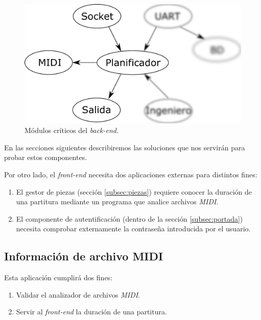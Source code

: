\begin{figure}[H]
	\noindent \begin{centering}
		\includegraphics[width=\linewidth/2]{capitulo4/daemon_critical}
		\par\end{centering}
	\smallskip
	\caption{\label{fig:daemon_critical} Módulos críticos del \textit{back-end}.}
\end{figure} 

\smallskip

En las secciones siguientes describiremos las soluciones que nos servirán para probar estos componentes.

Por otro lado, el \textit{front-end} necesita dos aplicaciones externas para distintos fines:

\begin{enumerate}
	\item El gestor de piezas (sección \ref{subsec:piezas}) requiere conocer la duración de una partitura mediante un programa que analice archivos \textit{MIDI}.
	\item El componente de autentificación (dentro de la sección \ref{subsec:portada}) necesita comprobar externamente la contraseña introducida por el usuario.
\end{enumerate}

\subsection{Información de archivo MIDI}
\label{subsec:midinfo}

Esta aplicación cumplirá dos fines:

\begin{enumerate}
	\item Validar el analizador de archivos \textit{MIDI}.
	\item Servir al \textit{front-end} la duración de una partitura.
\end{enumerate}

